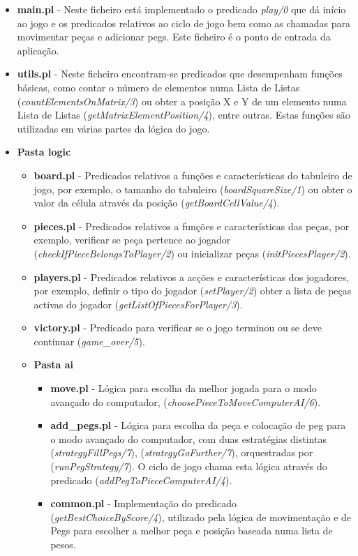 \documentclass[paper=a4, fontsize=11pt]{scrartcl} %
\numberwithin{equation}{section} %
\numberwithin{figure}{section} %
\numberwithin{table}{section} %
\begin{document}
\begin{itemize}
	\item \textbf{main.pl} - Neste ficheiro está implementado o predicado \textit{play/0} que dá início ao jogo e os predicados relativos ao ciclo de jogo bem como as chamadas para movimentar peças e adicionar pegs. Este ficheiro é o ponto de entrada da aplicação.
	\item \textbf{utils.pl} - Neste ficheiro encontram-se predicados que desempenham funções básicas, como contar o número de elementos numa Lista de Listas (\textit{countElementsOnMatrix/3}) ou obter a posição X e Y de um elemento numa Lista de Listas (\textit{getMatrixElementPosition/4}), entre outras. Estas funções são utilizadas em várias partes da lógica do jogo.
	\item \textbf{Pasta logic}
	\begin{itemize}
		\item \textbf{board.pl} - Predicados relativos a funções e características do tabuleiro de jogo, por exemplo, o tamanho do tabuleiro (\textit{boardSquareSize/1}) ou obter o valor da célula através da posição (\textit{getBoardCellValue/4}).
		\item \textbf{pieces.pl} - Predicados relativos a funções e características das peças, por exemplo, verificar se peça pertence ao jogador (\textit{checkIfPieceBelongsToPlayer/2}) ou inicializar peças (\textit{initPiecesPlayer/2}).
		\item \textbf{players.pl} - Predicados relativos a acções e características dos jogadores, por exemplo, definir o tipo do jogador (\textit{setPlayer/2}) obter a lista de peças activas do jogador (\textit{getListOfPiecesForPlayer/3}).
		\item \textbf{victory.pl} - Predicado  para verificar se o jogo terminou ou se deve continuar (\textit{game\_over/5}).
		\item \textbf{Pasta ai}
			\begin{itemize}
						\item \textbf{move.pl} - Lógica para escolha da melhor jogada para o modo avançado do computador, (\textit{choosePieceToMoveComputerAI/6}).
						\item \textbf{add\_pegs.pl} - Lógica para escolha da peça e colocação de peg  para o modo avançado do computador, com duas estratégias distintas (\textit{strategyFillPegs/7}), (\textit{strategyGoFurther/7}), orquestradas por (\textit{runPegStrategy/7}). O ciclo de jogo chama esta lógica através do predicado (\textit{addPegToPieceComputerAI/4}).
						\item \textbf{common.pl} - Implementação do predicado (\textit{getBestChoiceByScore/4}), utilizado pela lógica de movimentação e de Pegs para escolher a melhor peça e posição baseada numa lista de pesos.

\end{itemize}
\end{itemize}
\end{itemize}
\end{document}
